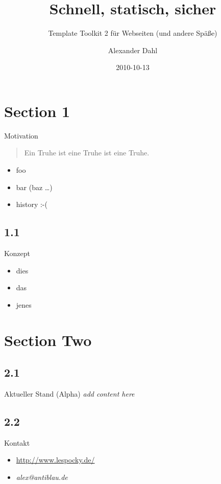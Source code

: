 \documentclass[hyperref={pdfpagelabels=false}]{beamer}
\title[Template Toolkit 2]{Schnell, statisch, sicher}
\subtitle{Template Toolkit 2 für Webseiten (und andere Späße)}
\author{Alexander Dahl}
\institute[lespocky.de]{\url{http://www.lespocky.de/}}
\date{2010-10-13}
\begin{document}
 

\begin{frame}
	\titlepage
\end{frame}

\section{Section 1}

\begin{frame}{Motivation}
    \begin{quotation}
        Ein Truhe ist eine Truhe ist eine Truhe.
    \end{quotation}
    \pause
	\begin{itemize}
		\item foo
		\item bar (baz \dots)
		\item {} history :-(
	\end{itemize}
\end{frame}

\subsection{1.1}

\begin{frame}{Konzept}
	\begin{itemize}
		\item dies
		\item das
		\item jenes
	\end{itemize}
\end{frame}

\section{Section Two}

\subsection{2.1}

\begin{frame}{Aktueller Stand (Alpha)}
    \emph{add content here}
\end{frame}

\subsection{2.2}

\begin{frame}{Kontakt}
    \begin{itemize}
        \item \url{http://www.lespocky.de/}
        \item \emph{alex@antiblau.de}
    \end{itemize}
\end{frame}
\end{document}
